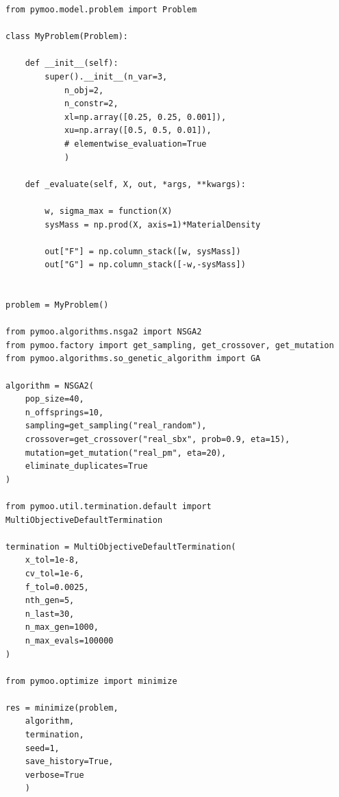 \documentclass[a4paper,12pt]{article}
\begin{document}
\begin{verbatim}
from pymoo.model.problem import Problem

class MyProblem(Problem):

	def __init__(self):
		super().__init__(n_var=3, 
			n_obj=2,
			n_constr=2,
			xl=np.array([0.25, 0.25, 0.001]),
			xu=np.array([0.5, 0.5, 0.01]),
			# elementwise_evaluation=True
			)

	def _evaluate(self, X, out, *args, **kwargs):

		w, sigma_max = function(X) 
		sysMass = np.prod(X, axis=1)*MaterialDensity

		out["F"] = np.column_stack([w, sysMass])
		out["G"] = np.column_stack([-w,-sysMass])


problem = MyProblem()

from pymoo.algorithms.nsga2 import NSGA2
from pymoo.factory import get_sampling, get_crossover, get_mutation
from pymoo.algorithms.so_genetic_algorithm import GA

algorithm = NSGA2(
	pop_size=40,
	n_offsprings=10,
	sampling=get_sampling("real_random"),
	crossover=get_crossover("real_sbx", prob=0.9, eta=15),
	mutation=get_mutation("real_pm", eta=20),
	eliminate_duplicates=True
)

from pymoo.util.termination.default import MultiObjectiveDefaultTermination

termination = MultiObjectiveDefaultTermination(
    x_tol=1e-8,
    cv_tol=1e-6,
    f_tol=0.0025,
    nth_gen=5,
    n_last=30,
    n_max_gen=1000,
    n_max_evals=100000
)

from pymoo.optimize import minimize

res = minimize(problem, 
	algorithm, 
	termination, 
	seed=1, 
	save_history=True, 
	verbose=True
	)
\end{verbatim}




\end{document}
